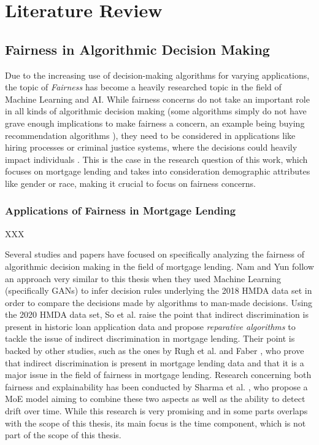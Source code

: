 \chapter{Literature Review}\label{chap:lit}

\section{Fairness in Algorithmic Decision Making}\label{sec:fairness}

Due to the increasing use of decision-making algorithms for varying applications, the topic of \textit{Fairness} has become a heavily researched topic in the field of Machine Learning and AI.\@
While fairness concerns do not take an important role in all kinds of algorithmic decision making (some algorithms simply do not have grave enough implications to make fairness a concern, an example being buying recommendation algorithms \parencite{Marcinkevics2023}), 
they need to be considered in applications like hiring processes or criminal justice systems, where the decisions could heavily impact individuals \parencite{Barocas2016}.
This is the case in the research question of this work, which focuses on mortgage lending and takes into consideration demographic attributes like gender or race, making it crucial to focus on fairness concerns.

\subsection{Applications of Fairness in Mortgage Lending}\label{subsec:mortgage_lending_fairness}

XXX

Several studies and papers have focused on specifically analyzing the fairness of algorithmic decision making in the field of mortgage lending.
Nam and Yun \parencite{Nam2022} follow an approach very similar to this thesis when they used Machine Learning (specifically GANs) to infer decision rules underlying the 2018 HMDA data set in order to compare the decisions made by algorithms to man-made decisions.
Using the 2020 HMDA data set, So et al. \parencite{So2022} raise the point that indirect discrimination is present in historic loan application data and propose \textit{reparative algorithms} to tackle the issue of indirect discrimination in mortgage lending.
Their point is backed by other studies, such as the ones by Rugh et al. \parencite{Rugh2015} and Faber \parencite{Faber2013}, who prove that indirect discrimination is present in mortgage lending data and that it is a major issue in the field of fairness in mortgage lending.
Research concerning both fairness and explainability has been conducted by Sharma et al. \parencite{Sharma2022}, who propose a MoE model aiming to combine these two aspects as well as the ability to detect drift over time.
While this research is very promising and in some parts overlaps with the scope of this thesis, its main focus is the time component, which is not part of the scope of this thesis.

